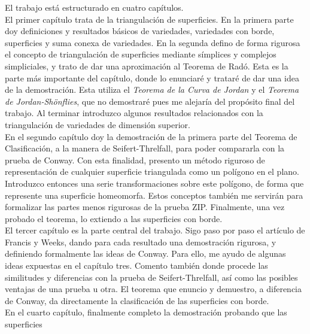 \documentclass[10pt]{report}
\theoremstyle{definition}
\begin{document}
El trabajo está estructurado en cuatro capítulos.\\

El primer capítulo trata de la triangulación de superficies. En la primera parte doy definiciones y resultados básicos de variedades, variedades con borde, superficies y suma conexa de variedades. En la segunda defino de forma rigurosa el concepto de triangulación de superficies mediante símplices y complejos simpliciales, y trato de dar una aproximación al Teorema de Radó. Esta es la parte más importante del capítulo, donde lo enunciaré y trataré de dar una idea de la demostración. Esta utiliza el \textit{Teorema de la Curva de Jordan} y el \textit{Teorema de Jordan-Shönflies}, que no demostraré pues me alejaría del propósito final del trabajo. Al terminar introduzco algunos resultados relacionados con la triangulación de variedades de dimensión superior.\\

En el segundo capítulo doy la demostración de la primera parte del Teorema de Clasificación, a la manera de Seifert-Threlfall, para poder compararla con la prueba de Conway. Con esta finalidad, presento un método riguroso de representación de cualquier superficie triangulada como un polígono en el plano. Introduzco entonces una serie transformaciones sobre este polígono, de forma que represente una superficie homeomorfa. Estos conceptos también me servirán para formalizar las partes menos rigurosas de la prueba ZIP. Finalmente, una vez probado el teorema, lo extiendo a las superficies con borde.\\

El tercer capítulo es la parte central del trabajo. Sigo paso por paso el artículo de Francis y Weeks, dando para cada resultado una demostración rigurosa, y definiendo formalmente las ideas de Conway. Para ello, me ayudo de algunas ideas expuestas en el capítulo tres. Comento también  donde procede las similitudes y diferencias con la prueba de Seifert-Threlfall, así como las posibles ventajas de una prueba u otra. El teorema que enuncio y demuestro, a diferencia de Conway, da directamente la clasificación de las superficies con borde.\\

En el cuarto capítulo, finalmente completo la demostración probando que las superficies







\clearpage

\tableofcontents
\clearpage
\listoffigures
\end{document}
